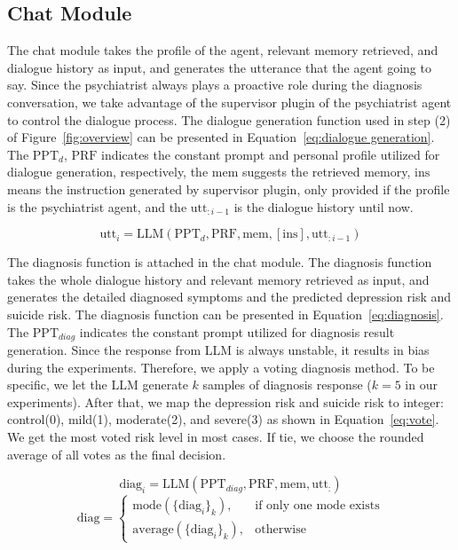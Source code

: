\subsection{Chat Module}
The chat module takes the profile of the agent, relevant memory retrieved, and dialogue history as input, and generates the utterance that the agent going to say. Since the psychiatrist always plays a proactive role during the diagnosis conversation, we take advantage of the supervisor plugin 
of the psychiatrist agent to control the dialogue process. The dialogue generation function used in step (2) of Figure~\ref{fig:overview} can be presented in Equation~\ref{eq:dialogue generation}. The $\mathrm{PPT}_d$, $\mathrm{PRF}$ indicates the constant prompt and personal profile utilized for dialogue generation, respectively, the $\mathrm{mem}$ suggests the retrieved memory, $\mathrm{ins}$ means the instruction generated by supervisor plugin, only provided if the profile is the psychiatrist agent, and the $\mathrm{utt}_{:i-1}$ is the dialogue history until now. 

\begin{equation}
    \mathrm{utt}_{i} = \mathrm{LLM}(\mathrm{PPT}_d, \mathrm{PRF}, \mathrm{mem}, [\mathrm{ins}],\mathrm{utt}_{:i-1})
    \label{eq:dialogue generation}
\end{equation}

The diagnosis function is attached in the chat module. The diagnosis function takes the whole dialogue history and relevant memory retrieved as input, and generates the detailed diagnosed symptoms and the predicted depression risk and suicide risk. The diagnosis function can be presented in Equation~\ref{eq:diagnosis}. The $\mathrm{PPT}_{diag}$ indicates the constant prompt utilized for diagnosis result generation. Since the response from LLM is always unstable, it results in bias during the experiments. Therefore, we apply a voting diagnosis method. To be specific, we let the LLM generate $k$ samples of diagnosis response ($k=5$ in our experiments). After that, we map the depression risk and suicide risk to integer: control(0), mild(1), moderate(2), and severe(3) as shown in Equation~\ref{eq:vote}. We get the most voted risk level in most cases. If tie, we choose the rounded average of all votes as the final decision. 

\begin{equation}
    \mathrm{diag}_i = \mathrm{LLM}(\mathrm{PPT}_{diag}, \mathrm{PRF}, \mathrm{mem}, \mathrm{utt}_{:})
    \label{eq:diagnosis}
\end{equation}
\begin{equation}
\mathrm{diag}=\begin{cases}
      \mathrm{mode}(\{\mathrm{diag}_i\}_k), & \text{if only one mode exists} \\ 
      \mathrm{average}(\{\mathrm{diag}_i\}_k), & \text{otherwise}
    \end{cases}
\label{eq:vote}
\end{equation}

